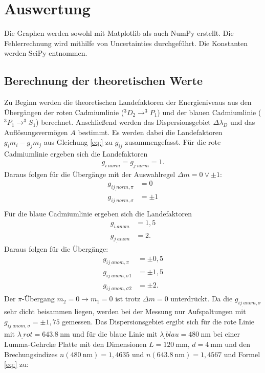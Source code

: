 \section{Auswertung}
\label{sec:Auswertung}

Die Graphen werden sowohl mit Matplotlib \cite{matplotlib} als auch NumPy \cite{numpy} erstellt. Die Fehlerrechnung wird mithilfe von Uncertainties \cite{uncertainties} durchgeführt. Die Konstanten werden SciPy \cite{scipy} entnommen.

\subsection{Berechnung der theoretischen Werte}

Zu Beginn werden die theoretischen Landefaktoren der Energieniveaus aus den Übergängen der roten Cadmiumlinie ($^3D_2 \rightarrow^3P_1$) und der blauen Cadmiumlinie ($^3P_1 \rightarrow^3S_1$) berechnet. 
Anschließend werden das Dispersionsgebiet $\Delta\lambda_D$ und das Auflösungsvermögen $A$ bestimmt.
Es werden dabei die Landefaktoren $g_im_i-g_jm_j$ aus Gleichung \ref{eq:} zu $g_{ij}$ zusammengefasst.
Für die rote Cadmiumlinie ergeben sich die Landefaktoren
\[
g_{i_.{norm}}=g_{j_.{norm}}=1\text{.}
\]
Daraus folgen für die Übergänge mit der Auswahlregel $\Delta m=0 \lor \pm 1$:
\begin{align*}
g_{ij_.{norm,\pi}}&=0\\
g_{ij_.{norm,\sigma}}&=\pm 1\\
\end{align*}
Für die blaue Cadmiumlinie ergeben sich die Landefaktoren
\begin{align*}
g_{i_.{anom}} &= 1,5\\
g_{j_.{anom}} &= 2 \text{.}
\end{align*}
Daraus folgen für die Übergänge:
\begin{align*}
g_{ij_.{anom,\pi}}&=\pm 0,5\\
g_{ij_.{anom,\sigma1}}&= \pm 1,5\\
g_{ij_.{anom,\sigma2}}&= \pm 2 \text{.}
\end{align*}
Der $\pi$-Übergang $m_2=0\rightarrow m_1=0$ ist trotz $\Delta m=0$ unterdrückt.
Da die $g_{ij_.{anom,\sigma}}$ sehr dicht beisammen liegen, werden bei der Messung nur Aufspaltungen mit $g_{ij_.{anom,\sigma}} = \pm 1,75$ gemessen.
Das Dispersionsgebiet ergibt sich für die rote Linie mit $\lambda_.{rot}=\SI{643.8}{\nano\metre}$ und für die blaue Linie mit $\lambda_.{blau}=\SI{480}{\nano\metre}$ bei einer Lumma-Gehrcke Platte mit den Dimensionen $L=\SI{120}{\milli\metre}$, $d=\SI{4}{\milli\metre}$ und den Brechungsindizes $n(\SI{480}{\nano\metre})=1,4635$ und $n(\SI{643.8}{\nano\metre})=1,4567$ und Formel \eqref{eq:} zu:
